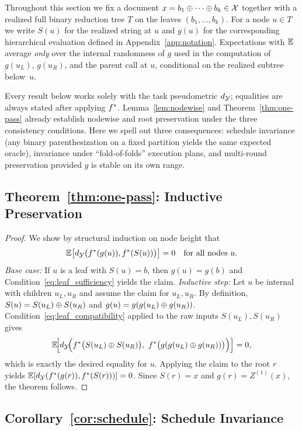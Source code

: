 Throughout this section we fix a document $x=b_1\oplus\cdots\oplus b_k\in\mathcal{X}$ together with a realized full binary reduction tree $T$ on the leaves $(b_1,\dots,b_k)$. For a node $u\in T$ we write $S(u)$ for the realized string at $u$ and $g(u)$ for the corresponding hierarchical evaluation defined in Appendix~\ref{app:notation}. Expectations with $\mathbb{E}$ average \emph{only} over the internal randomness of $g$ used in the computation of $g(u_L)$, $g(u_R)$, and the parent call at $u$, conditional on the realized subtree below~$u$.

\medskip\noindent
Every result below works solely with the task pseudometric $d_{\mathcal{Y}}$; equalities are always stated after applying $f^{\ast}$. Lemma~\ref{lem:nodewise} and Theorem~\ref{thm:one-pass} already establish nodewise and root preservation under the three consistency conditions. Here we spell out three consequences: schedule invariance (any binary parenthesization on a fixed partition yields the same expected oracle), invariance under ``fold-of-folds'' execution plans, and multi-round preservation provided $g$ is stable on its own range.

\subsection{Theorem~\ref{thm:one-pass}: Inductive Preservation}

\begin{proof}
We show by structural induction on node height that
\[
\mathbb{E}\big[d_{\mathcal{Y}}\big(f^{\ast}(g(u)),f^{\ast}(S(u))\big)\big]=0
\quad\text{for all nodes }u.
\]
\emph{Base case:} If $u$ is a leaf with $S(u)=b$, then $g(u)=g(b)$ and Condition~\eqref{eq:leaf_sufficiency} yields the claim.
\emph{Inductive step:} Let $u$ be internal with children $u_L,u_R$ and assume the claim for $u_L,u_R$. By definition, $S(u)=S(u_L)\oplus S(u_R)$ and $g(u)=g(g(u_L)\oplus g(u_R))$. Condition~\eqref{eq:leaf_compatibility} applied to the raw inputs $S(u_L),S(u_R)$ gives
\[
\mathbb{E}\!\Big[d_{\mathcal{Y}}\!\Big(f^{\ast}\big(S(u_L)\oplus S(u_R)\big),\ f^{\ast}\big(g(g(u_L)\oplus g(u_R))\big)\Big)\Big]=0,
\]
which is exactly the desired equality for $u$. Applying the claim to the root $r$ yields
$\mathbb{E}[d_{\mathcal{Y}}(f^{\ast}(g(r)),f^{\ast}(S(r)))] = 0$. Since $S(r)=x$ and $g(r)=Z^{(1)}(x)$, the theorem follows.
\end{proof}

\subsection{Corollary~\ref{cor:schedule}: Schedule Invariance}

